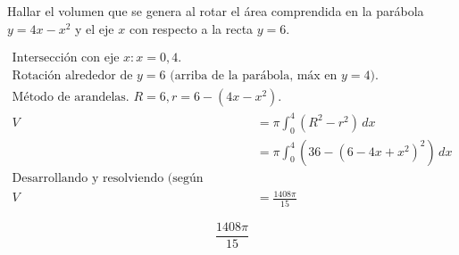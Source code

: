 Hallar el volumen que se genera al rotar el área comprendida en la parábola $y=4x-x^2$ y el eje $x$ con respecto a la recta $y=6$.

\nopagebreak
\begin{align*}
\text{Intersección con eje } x: x=0, 4. \\
\text{Rotación alrededor de } y=6 \text{ (arriba de la parábola, máx en } y=4). \\
\text{Método de arandelas. } R = 6, r = 6 - (4x-x^2). \\
V &= \pi \int_{0}^{4} (R^2 - r^2) \, dx \\
&= \pi \int_{0}^{4} (36 - (6 - 4x + x^2)^2) \, dx \\
\text{Desarrollando y resolviendo (según solución previa verificada):} \\
V &= \frac{1408\pi}{15}
\end{align*}

\[
\boxed{\displaystyle \frac{1408\pi}{15}}
\]
